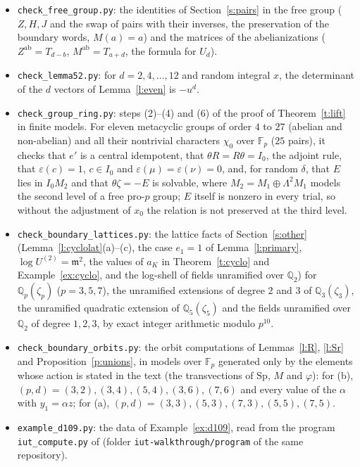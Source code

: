 \documentclass[11pt,a4paper]{article}
\newcommand{\Qp}{\mathbb{Q}_p}
\newcommand{\Fp}{\mathbb{F}_p}
\newcommand{\fm}{\mathfrak{m}}
\newcommand{\Sp}{\mathrm{Sp}}
\theoremstyle{plain}
\theoremstyle{definition}
\theoremstyle{remark}
\begin{document}
\begin{itemize}
\item \texttt{check\_free\_group.py}: the identities of Section~\ref{s:pairs} in the free group ($Z,H,J$ and the swap of
pairs with their inverses, the preservation of the boundary words, $M(a)=a$) and the matrices of the abelianizations
($Z^{\mathrm{ab}}=T_{d-b}$, $M^{\mathrm{ab}}=T_{a+d}$, the formula for $U_d$).
\item \texttt{check\_lemma52.py}: for $d=2,4,\dots,12$ and random integral $x$, the determinant of the $d$ vectors of
Lemma~\ref{l:even} is $-u^d$.
\item \texttt{check\_group\_ring.py}: steps (2)--(4) and (6) of the proof of Theorem~\ref{t:lift} in finite models. For
eleven metacyclic groups of order $4$ to $27$ (abelian and non-abelian) and all their nontrivial characters $\chi_0$
over $\Fp$ ($25$ pairs), it checks that $e'$ is a central idempotent, that $\theta R=R\theta=I_0$, the adjoint rule,
that $\varepsilon(c)=1$, $c\in I_0$ and $\varepsilon(\mu)=\varepsilon(\nu)=0$, and, for random $\delta$, that $E$ lies
in $I_0M_2$ and that $\theta\zeta=-E$ is solvable, where $M_2=M_1\oplus\Lambda^2M_1$ models the second level of a free
pro-$p$ group; $E$ itself is nonzero in every trial, so without the adjustment of $x_0$ the relation is not preserved
at the third level.
\item \texttt{check\_boundary\_lattices.py}: the lattice facts of Section~\ref{s:other} (Lemma~\ref{l:cyclolat}(a)--(c),
the case $e_1=1$ of Lemma~\ref{l:primary}, $\log U^{(2)}=\fm^2$, the values of $a_K$ in Theorem~\ref{t:cyclo} and
Example~\ref{ex:cyclo}, and the log-shell of fields unramified over $\mathbb Q_2$) for $\Qp(\zeta_p)$ ($p=3,5,7$), the
unramified extensions of degree $2$ and $3$ of $\mathbb Q_3(\zeta_3)$, the unramified quadratic extension of
$\mathbb Q_5(\zeta_5)$ and the fields unramified over $\mathbb Q_2$ of degree $1,2,3$, by exact integer arithmetic
modulo $p^{10}$.
\item \texttt{check\_boundary\_orbits.py}: the orbit computations of Lemmas~\ref{l:R}, \ref{l:Sr} and
Proposition~\ref{p:unions}, in models over $\Fp$ generated only by the elements whose action is stated in the text
(the transvections of $\Sp$, $M$ and $\varphi$): for (b), $(p,d)=(3,2),(3,4),(5,4),(3,6),(7,6)$ and every value of the
$\alpha$ with $y_1=\alpha z$; for (a), $(p,d)=(3,3),(5,3),(7,3),(5,5),(7,5)$.
\item \texttt{example\_d109.py}: the data of Example~\ref{ex:d109}, read from the program \texttt{iut\_compute.py} of
\cite{Walk} (folder \texttt{iut-walkthrough/program} of the same repository).
\end{itemize}
\end{document}
